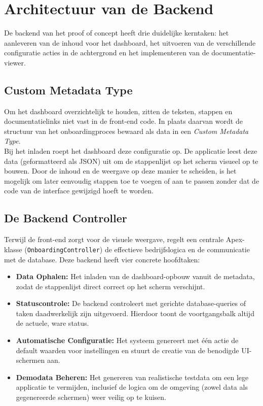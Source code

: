 \section{Architectuur van de Backend}
De backend van het proof of concept heeft drie duidelijke kerntaken: het aanleveren van de inhoud voor het dashboard, het uitvoeren van de verschillende configuratie acties in de achtergrond en het implementeren van de documentatie-viewer.

\subsection{Custom Metadata Type}
\label{subsec:dynamische_datastructuur}
Om het dashboard overzichtelijk te houden, zitten de teksten, stappen en documentatielinks niet vast in de front-end code. In plaats daarvan wordt de structuur van het onboardingproces bewaard als data in een \textit{Custom Metadata Type}.
\\

Bij het inladen roept het dashboard deze configuratie op. De applicatie leest deze data (geformatteerd als JSON) uit om de stappenlijst op het scherm visueel op te bouwen. Door de inhoud en de weergave op deze manier te scheiden, is het mogelijk om later eenvoudig stappen toe te voegen of aan te passen zonder dat de code van de interface gewijzigd hoeft te worden.

\subsection{De Backend Controller}
\label{subsec:backend_controller}
Terwijl de front-end zorgt voor de visuele weergave, regelt een centrale Apex-klasse (\texttt{OnboardingController}) de effectieve bedrijfslogica en de communicatie met de database. Deze backend heeft vier concrete hoofdtaken:

\begin{itemize}
	\item \textbf{Data Ophalen:} Het inladen van de dashboard-opbouw vanuit de metadata, zodat de stappenlijst direct correct op het scherm verschijnt.
	\item \textbf{Statuscontrole:} De backend controleert met gerichte database-queries of taken daadwerkelijk zijn uitgevoerd. Hierdoor toont de voortgangsbalk altijd de actuele, ware status.
	\item \textbf{Automatische Configuratie:} Het systeem genereert met één actie de default waarden voor instellingen en stuurt de creatie van de benodigde UI-schermen aan.
	\item \textbf{Demodata Beheren:} Het genereren van realistische testdata om een lege applicatie te vermijden, inclusief de logica om de omgeving (zowel data als gegenereerde schermen) weer veilig op te kuisen.
\end{itemize}

